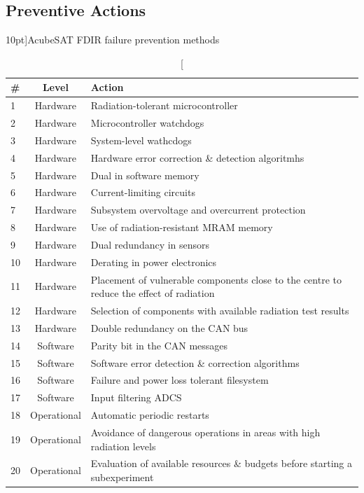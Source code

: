 \documentclass[a4paper,nobib]{tufte-book}
\begin{document}
\clearpage
\subsection{Preventive Actions}

\begin{table}[h]
	\centering
	\caption[][10pt]{AcubeSAT \acs{FDIR} failure prevention methods}
	\label{tab:fdir_preventive}
	\renewcommand{\arraystretch}{1.5}
	\begin{tabularx}{\textwidth}{@{}lcX@{}}
		\toprule
		\# & Level & Action \\ \midrule
		1 & Hardware & Radiation-tolerant microcontroller \\
		2 & Hardware & Microcontroller watchdogs \parencite{beningo_review_watchdog_2010} \\
		3 & Hardware & System-level wathcdogs \\
		4 & Hardware & Hardware error correction \& detection algoritmhs \\
		5 & Hardware & Dual in software memory \\
		6 & Hardware & Current-limiting circuits \\
		7 & Hardware & Subsystem overvoltage and overcurrent protection \\
		8 & Hardware & Use of radiation-resistant \acs{MRAM} memory \\
		9 & Hardware & Dual redundancy in sensors \\
		10 & Hardware & Derating in power electronics \\
		11 & Hardware & Placement of vulnerable components close to the centre to reduce the effect of radiation \\
		12 & Hardware & Selection of components with available radiation test results \\
		13 & Hardware & Double redundancy on the \acs{CAN} bus \\
		14 & Software & Parity bit in the \acs{CAN} messages \\
		15 & Software & Software error detection \& correction algorithms \\
		16 & Software & Failure and power loss tolerant filesystem \\
		17 & Software & Input filtering \acs{ADCS} \\
		18 & Operational & Automatic periodic restarts \\
		19 & Operational & Avoidance of dangerous operations in areas with high radiation levels \\
		20 & Operational & Evaluation of available resources \& budgets before starting a subexperiment \\ \bottomrule
	\end{tabularx}
\end{table}
\end{document}
